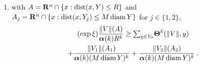 \begin{lemma}
\begin{enumerate}[label=(\arabic*),start=7]
            whenever $j \in \{1,2\}$ and $y \in Y_j$;
        \item \label{al:6.1(12)} with $A = \mathbf{R}^{n} \cap \{ x : \operatorname{dist}(x,Y) \le R \}$ and $A_j =
            \mathbf{R}^{n} \cap \{ x : \operatorname{dist}(x,Y_j) \le M \operatorname{diam} Y \}$ for $j \in \{1,2\}$,
            \begin{multline*}
                [(1 + 1/M)^{\vdim} + (\nu + 1)/M] (\exp \xi) \frac{\|V\|(A)}{\unitmeasure{\vdim}
                R^{\vdim}} \ge \textsum{y \in Y_0}{} \density^{\vdim}(\|V\|,y) \\ +
                \frac{\|V_1\|(A_1)}{\unitmeasure{\vdim} (M \diam Y)^{\vdim}} + \frac{\|V_2\|(A_2)}
                {\unitmeasure{\vdim} (M \diam Y)^{\vdim}} \,.
            \end{multline*}
    \end{enumerate}
\end{lemma}

